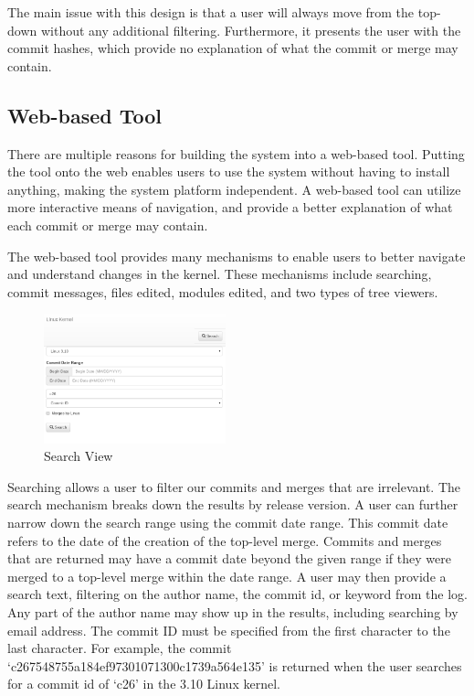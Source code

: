 \documentclass[conference, draftclsnofoot]{IEEEtran}
\begin{document}
The main issue with this design is that a user will always move from the
top-down without any additional filtering. Furthermore, it presents the user
with the commit hashes, which provide no explanation of what the commit or
merge may contain.

\subsection{Web-based Tool}

There are multiple reasons for building the system into a web-based tool.
Putting the tool onto the web enables users to use the system without having to
install anything, making the system platform independent. A web-based tool can
utilize more interactive means of navigation, and provide a better explanation
of what each commit or merge may contain.

The web-based tool provides many mechanisms to enable users to better navigate
and understand changes in the kernel. These mechanisms include searching,
commit messages, files edited, modules edited, and two types of tree viewers.

\begin{figure}[h]
	\centering
	\includegraphics[width=0.47\textwidth]{figures/search.png}
	\caption{Search View}
	\label{fig:search}
\end{figure}

Searching allows a user to filter our commits and merges that are irrelevant.
The search mechanism breaks down the results by release version. A user can
further narrow down the search range using the commit date range. This commit
date refers to the date of the creation of the top-level merge. Commits and
merges that are returned may have a commit date beyond the given range if they
were merged to a top-level merge within the date range. A user may then provide
a search text, filtering on the author name, the commit id, or keyword from the
log. Any part of the author name may show up in the results, including
searching by email address. The commit ID must be specified from the first
character to the last character. For example, the commit
`c267548755a184ef97301071300c1739a564e135' is returned when the user searches
for a commit id of `c26' in the 3.10 Linux kernel.
\end{document}
